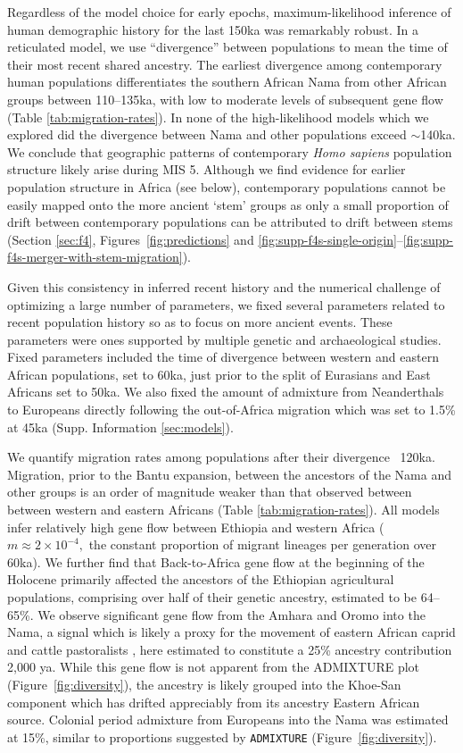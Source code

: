 \documentclass[]{article}
\begin{document}
Regardless of the model choice for early epochs, maximum-likelihood inference of human demographic
history for the last 150ka was remarkably robust.
In a reticulated model, we use ``divergence'' between populations to mean
the time of their most recent shared ancestry.
The earliest divergence among
contemporary human populations differentiates the southern African Nama from
other African groups between 110--135ka, with low to moderate levels of
subsequent gene flow (Table \ref{tab:migration-rates}). In none of the
high-likelihood models which we explored did the divergence between Nama and
other populations exceed $\sim$140ka. 
We conclude that geographic patterns of contemporary \emph{Homo sapiens} population structure
likely arise during MIS 5.
Although we find evidence for earlier population structure in Africa (see
below), contemporary populations cannot be easily mapped onto the more ancient
`stem' groups as only a small proportion of drift between contemporary populations can
be attributed to drift between stems (Section \ref{sec:f4},  Figures~\ref{fig:predictions} and
\ref{fig:supp-f4s-single-origin}--\ref{fig:supp-f4s-merger-with-stem-migration}). 

Given this consistency in inferred recent history and the numerical challenge
of optimizing a large number of parameters, we fixed several parameters related
to recent population history so as to focus on more ancient events. These parameters were ones supported by multiple genetic and archaeological studies.
Fixed parameters included the time of divergence between western and eastern African populations,
set to 60ka, just prior to the split of Eurasians and East Africans set to 50ka. 
We also fixed the amount of admixture from Neanderthals to Europeans directly
following the out-of-Africa migration which was set to 1.5\% at 45ka (Supp. Information \ref{sec:models}).

We quantify migration rates among populations after their divergence ~120ka.
Migration, prior to the Bantu expansion, between the ancestors of the Nama and other groups  
is an order of magnitude weaker than that observed between between western and eastern Africans (Table \ref{tab:migration-rates}).
All models infer relatively high gene flow between Ethiopia and western Africa
($m\approx2\times10^{-4},$ the constant proportion of migrant lineages per generation over 60ka).
We further find that Back-to-Africa gene flow at the beginning of the Holocene primarily
affected the ancestors of the Ethiopian agricultural populations, comprising
over half of their genetic ancestry, estimated to be 64--65\%. 
We observe significant gene flow from the Amhara and Oromo into the Nama, a signal which is likely a proxy for the movement of
eastern African caprid and cattle pastoralists \citep{Henn2008-xo,Breton2014-xb}, here estimated to constitute a 25\% ancestry
contribution 2,000 ya. While this gene flow is not apparent from the ADMIXTURE plot (Figure~\ref{fig:diversity}), the ancestry is likely grouped into the Khoe-San component which has drifted appreciably from its ancestry Eastern African source. Colonial period admixture from Europeans into the Nama
was estimated at 15\%, similar to proportions suggested by \texttt{ADMIXTURE}
(Figure~\ref{fig:diversity}).
\end{document}
